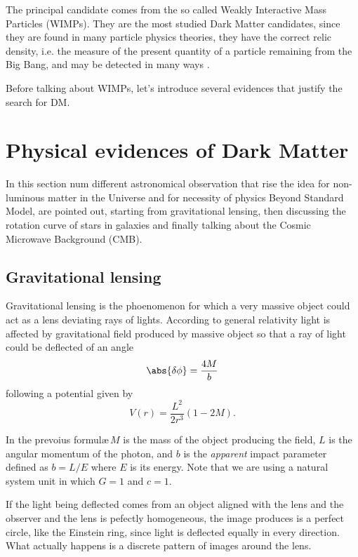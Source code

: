 The principal candidate comes from the so called Weakly Interactive Mass Particles (WIMPs). They are the most studied Dark Matter candidates, since they are found in many particle physics theories, they have the correct relic density, i.e. the measure of the present quantity of a particle remaining from the Big Bang, and may be detected in many ways \cite{feng:DM}.

Before talking about WIMPs, let's introduce several evidences that justify the search for DM.

\section{Physical evidences of Dark Matter}
In this section num different astronomical observation that rise the idea for non-luminous matter in the Universe and for necessity of physics Beyond Standard Model, are pointed out, starting from gravitational lensing, then discussing the rotation curve of stars in galaxies and finally talking about the Cosmic Microwave Background (CMB).

\subsection{Gravitational lensing}
Gravitational lensing is the phoenomenon for which a very massive object could act as a lens deviating rays of lights. According to general relativity light is affected by gravitational field produced by massive object so that a ray of light could be deflected of an angle 
\begin{equation}
\abs{\delta\phi}=\frac{4M}{b}
\end{equation}
following a potential given by
\begin{equation}
V(r)=\frac{L^2}{2r^3}(1-2M).
\end{equation}

In the prevoius formul\ae $\,M$ is the mass of the object producing the field, $L$ is the angular momentum of the photon, and $b$ is the \emph{apparent} impact parameter defined as $b=L/E$ where $E$ is its energy. Note that we are using a natural system unit in which $G=1$ and $c=1$.

If the light being deflected comes from an object aligned with the lens and the observer and the lens is pefectly homogeneous, the image produces is a perfect circle, like the Einstein ring, since light is deflected equally in every direction. What actually happens is a discrete pattern of images around the lens.

